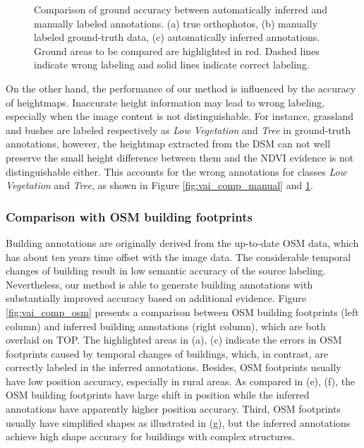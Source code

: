 \begin{figure}[H]
\begin{subfigure}{0.315\columnwidth}
  \caption{}
\end{subfigure}
\caption{Comparison of ground accuracy between automatically inferred and manually labeled annotations. (a) true orthophotos, (b) manually labeled ground-truth data, (c) automatically inferred annotations. Ground areas to be compared are highlighted in red. Dashed lines indicate wrong labeling and solid lines indicate correct labeling.}
\label{fig:vai_comp_manual_ground}
\end{figure}



On the other hand, the performance of our method is influenced by the accuracy of heightmaps. Inaccurate height information may lead to wrong labeling, especially when the image content is not distinguishable. For instance, grassland and bushes are labeled respectively as \textit{Low Vegetation} and \textit{Tree} in ground-truth annotations, however, the heightmap extracted from the DSM can not well preserve the small height difference between them and the NDVI evidence is not distinguishable either. This accounts for the wrong annotations for classes \textit{Low Vegetation} and \textit{Tree}, as shown in Figure \ref{fig:vai_comp_manual} and \ref{fig:vai_comp_manual_ground}. 


\subsubsection{Comparison with OSM building footprints}
Building annotations are originally derived from the up-to-date OSM data, which has about ten years time offset with the image data. The considerable temporal changes of building result in low semantic accuracy of the source labeling. Nevertheless, our method is able to generate building annotations with substantially improved accuracy based on additional evidence. Figure \ref{fig:vai_comp_osm} presents a comparison between OSM building footprints (left column) and inferred building annotations (right column), which are both overlaid on TOP. The highlighted areas in (a), (c) indicate the errors in OSM footprints caused by temporal changes of buildings, which, in contrast, are correctly labeled in the inferred annotations. Besides, OSM footprints usually have low position accuracy, especially in rural areas. As compared in (e), (f), the OSM building footprints have large shift in position while the inferred annotations have apparently higher position accuracy. Third, OSM footprints usually have simplified shapes as illustrated in (g), but the inferred annotations achieve high shape accuracy for buildings with complex structures.


